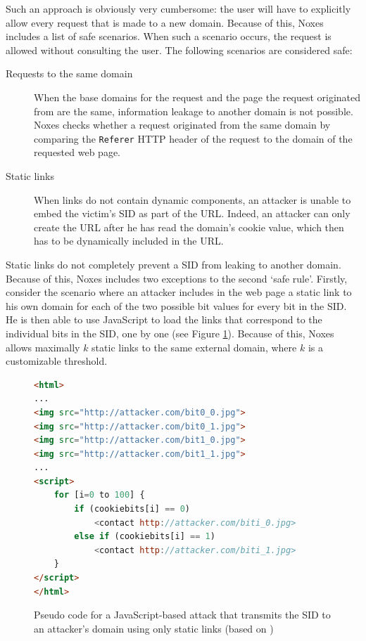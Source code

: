 Such an approach is obviously very cumbersome: the user will have to explicitly allow every request that is made to a new domain. Because of this, Noxes includes a list of safe scenarios. When such a scenario occurs, the request is allowed without consulting the user. The following scenarios are considered safe:
\begin{description}
	\item[Requests to the same domain] When the base domains for the request and the page the request originated from are the same, information leakage to another domain is not possible. Noxes checks whether a request originated from the same domain by comparing the \texttt{Referer} HTTP header of the request to the domain of the requested web page.
	\item[Static links] When links do not contain dynamic components, an attacker is unable to embed the victim's SID as part of the URL. Indeed, an attacker can only create the URL after he has read the domain's cookie value, which then has to be dynamically included in the URL.
\end{description}
Static links do not completely prevent a SID from leaking to another domain. Because of this, Noxes includes two exceptions to the second `safe rule'. Firstly, consider the scenario where an attacker includes in the web page a static link to his own domain for each of the two possible bit values for every bit in the SID. He is then able to use JavaScript to load the links that correspond to the individual bits in the SID, one by one (see Figure \ref{Noxes-attack}). Because of this, Noxes allows maximally $k$ static links to the same external domain, where $k$ is a customizable threshold.

\begin{figure}
\begin{lstlisting}[language=HTML]
<html>
...
<img src="http://attacker.com/bit0_0.jpg">
<img src="http://attacker.com/bit0_1.jpg">
<img src="http://attacker.com/bit1_0.jpg">
<img src="http://attacker.com/bit1_1.jpg">
...
<script>
    for [i=0 to 100] {
        if (cookiebits[i] == 0)
            <contact http://attacker.com/biti_0.jpg>
        else if (cookiebits[i] == 1)
            <contact http://attacker.com/biti_1.jpg>
    }
</script>
</html>
\end{lstlisting}
	\caption[Using static links to transmit the SID to an attacker's domain]{\label{Noxes-attack}Pseudo code for a JavaScript-based attack that transmits the SID to an attacker's domain using only static links (based on \cite{Kirda2006})}
\end{figure}

